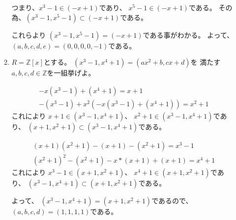 \documentclass[12pt,b5paper]{ltjsarticle}
\begin{document}
\begin{enumerate}
\begin{enumerate}
            つまり、$x^3-1\in (-x+1)$であり、
            $x^5-1\in (-x+1)$である。
            その為、$(x^3-1,x^5-1)\subset (-x+1)$である。

            これらより
            $(x^3-1,x^5-1)=(-x+1)$である事がわかる。
            よって、
            $(a,b,c,d,e)=(0,0,0,0,-1)$である。

            \hrulefill

       \item
            $R=\mathbb{Z}[x]$とする。
            $(x^3-1,x^4+1)=(ax^2+b,cx+d)$を
            満たす$a,b,c,d\in\mathbb{Z}$を一組挙げよ。

            \dotfill

            \begin{gather}
             -x(x^3-1) + (x^4+1) = x+1\\
             -(x^3-1) + x^2( -x(x^3-1) + (x^4+1) ) = x^2+1
            \end{gather}
            これにより
            $x+1\in (x^3-1,x^4+1)$、
            $x^2+1\in (x^3-1,x^4+1)$であり、
            $(x+1,x^2+1)\subset (x^3-1,x^4+1)$である。

            \begin{gather}
             (x+1)(x^2+1) -(x+1) -(x^2+1) = x^3-1\\
             (x^2+1)^2 -(x^2+1) -x*(x+1) +(x+1) = x^4+1
            \end{gather}
            これにより
            $x^3-1 \in (x+1,x^2+1)$、
            $x^4+1 \in (x+1,x^2+1)$であり、
            $(x^3-1,x^4+1) \subset (x+1,x^2+1)$である。

            よって、
            $(x^3-1,x^4+1) = (x+1,x^2+1)$であるので、
            $(a,b,c,d)=(1,1,1,1)$である。
            
            \hrulefill

      \end{enumerate}
\end{enumerate}
\end{document}
